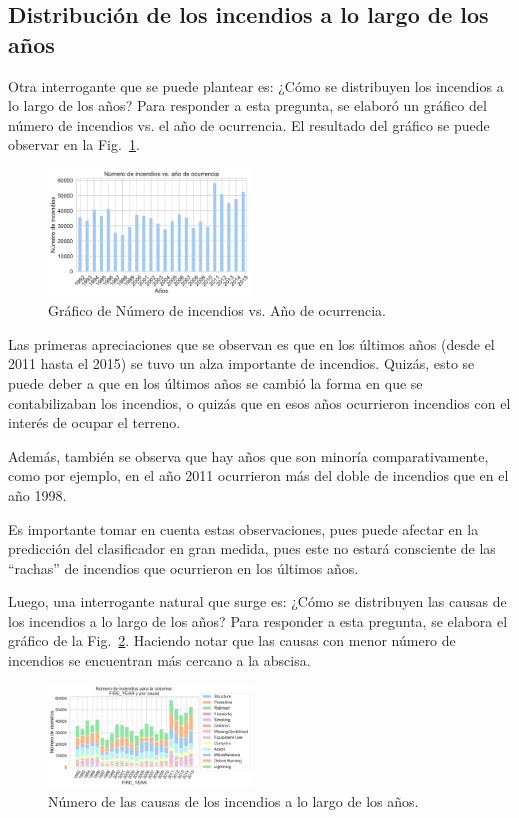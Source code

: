 \subsection{Distribución de los incendios a lo largo de los años}
Otra interrogante que se puede plantear es: ¿Cómo se distribuyen los incendios a lo largo de los años? Para responder a esta pregunta, se elaboró un gráfico del número de incendios vs. el año de ocurrencia. El resultado del gráfico se puede observar en la Fig.~\ref{fig:Year-Ocurr}.
\begin{figure}
    \centering
    \includegraphics[width=0.48\textwidth]{imagenes/YEAR_OCURRENCIA.pdf}
    \caption{Gráfico de Número de incendios vs. Año de ocurrencia.}
    \label{fig:Year-Ocurr}
\end{figure}

Las primeras apreciaciones que se observan es que en los últimos años (desde el 2011 hasta el 2015) se tuvo un alza importante de incendios. Quizás, esto se puede deber a que en los últimos años se cambió la forma en que se contabilizaban los incendios, o quizás que en esos años ocurrieron incendios con el interés de ocupar el terreno.

Además, también se observa que hay años que son minoría comparativamente, como por ejemplo, en el año 2011 ocurrieron más del doble de incendios que en el año 1998. 

Es importante tomar en cuenta estas observaciones, pues puede afectar en la predicción del clasificador en gran medida, pues este no estará consciente de las ``rachas'' de incendios que ocurrieron en los últimos años.

Luego, una interrogante natural que surge es: ¿Cómo se distribuyen las causas de los incendios a lo largo de los años? Para responder a esta pregunta, se elabora el gráfico de la Fig.~\ref{fig:stacked_fire_year}. Haciendo notar que las causas con menor número de incendios se encuentran más cercano a la abscisa.
\begin{figure}
    \centering
    \includegraphics[width=0.48\textwidth]{imagenes/stacked_FIRE_YEAR.pdf}
    \caption{Número de las causas de los incendios a lo largo de los años.}
    \label{fig:stacked_fire_year}
\end{figure}

